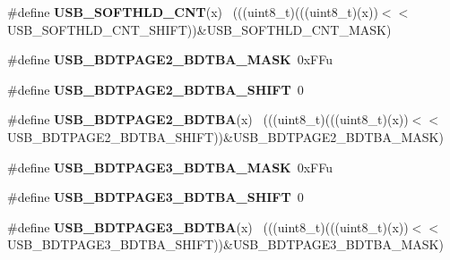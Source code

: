 \begin{DoxyCompactItemize}
\item 
\hypertarget{group___u_s_b___register___masks_ga1689293f6962d5a96505e5434314a003}{}\#define {\bfseries U\+S\+B\+\_\+\+S\+O\+F\+T\+H\+L\+D\+\_\+\+C\+N\+T}(x)                                          ~(((uint8\+\_\+t)(((uint8\+\_\+t)(x))$<$$<$U\+S\+B\+\_\+\+S\+O\+F\+T\+H\+L\+D\+\_\+\+C\+N\+T\+\_\+\+S\+H\+I\+F\+T))\&U\+S\+B\+\_\+\+S\+O\+F\+T\+H\+L\+D\+\_\+\+C\+N\+T\+\_\+\+M\+A\+S\+K)\label{group___u_s_b___register___masks_ga1689293f6962d5a96505e5434314a003}

\item 
\hypertarget{group___u_s_b___register___masks_ga69407c90a73a26bc60f3f9b75e4bd7c0}{}\#define {\bfseries U\+S\+B\+\_\+\+B\+D\+T\+P\+A\+G\+E2\+\_\+\+B\+D\+T\+B\+A\+\_\+\+M\+A\+S\+K}~0x\+F\+Fu\label{group___u_s_b___register___masks_ga69407c90a73a26bc60f3f9b75e4bd7c0}

\item 
\hypertarget{group___u_s_b___register___masks_gae67d0252b1559f854264f0fe52ff6fb5}{}\#define {\bfseries U\+S\+B\+\_\+\+B\+D\+T\+P\+A\+G\+E2\+\_\+\+B\+D\+T\+B\+A\+\_\+\+S\+H\+I\+F\+T}~0\label{group___u_s_b___register___masks_gae67d0252b1559f854264f0fe52ff6fb5}

\item 
\hypertarget{group___u_s_b___register___masks_gad5986a409593f83555e8141e3d569e5f}{}\#define {\bfseries U\+S\+B\+\_\+\+B\+D\+T\+P\+A\+G\+E2\+\_\+\+B\+D\+T\+B\+A}(x)                                    ~(((uint8\+\_\+t)(((uint8\+\_\+t)(x))$<$$<$U\+S\+B\+\_\+\+B\+D\+T\+P\+A\+G\+E2\+\_\+\+B\+D\+T\+B\+A\+\_\+\+S\+H\+I\+F\+T))\&U\+S\+B\+\_\+\+B\+D\+T\+P\+A\+G\+E2\+\_\+\+B\+D\+T\+B\+A\+\_\+\+M\+A\+S\+K)\label{group___u_s_b___register___masks_gad5986a409593f83555e8141e3d569e5f}

\item 
\hypertarget{group___u_s_b___register___masks_ga9081479345a744c85a74643600921b64}{}\#define {\bfseries U\+S\+B\+\_\+\+B\+D\+T\+P\+A\+G\+E3\+\_\+\+B\+D\+T\+B\+A\+\_\+\+M\+A\+S\+K}~0x\+F\+Fu\label{group___u_s_b___register___masks_ga9081479345a744c85a74643600921b64}

\item 
\hypertarget{group___u_s_b___register___masks_ga9850caac94013a6e84f9af9cbe0e0827}{}\#define {\bfseries U\+S\+B\+\_\+\+B\+D\+T\+P\+A\+G\+E3\+\_\+\+B\+D\+T\+B\+A\+\_\+\+S\+H\+I\+F\+T}~0\label{group___u_s_b___register___masks_ga9850caac94013a6e84f9af9cbe0e0827}

\item 
\hypertarget{group___u_s_b___register___masks_ga0fc3ca4bec40401b13e753b772a5a956}{}\#define {\bfseries U\+S\+B\+\_\+\+B\+D\+T\+P\+A\+G\+E3\+\_\+\+B\+D\+T\+B\+A}(x)                                    ~(((uint8\+\_\+t)(((uint8\+\_\+t)(x))$<$$<$U\+S\+B\+\_\+\+B\+D\+T\+P\+A\+G\+E3\+\_\+\+B\+D\+T\+B\+A\+\_\+\+S\+H\+I\+F\+T))\&U\+S\+B\+\_\+\+B\+D\+T\+P\+A\+G\+E3\+\_\+\+B\+D\+T\+B\+A\+\_\+\+M\+A\+S\+K)\label{group___u_s_b___register___masks_ga0fc3ca4bec40401b13e753b772a5a956}


\end{DoxyCompactItemize}
